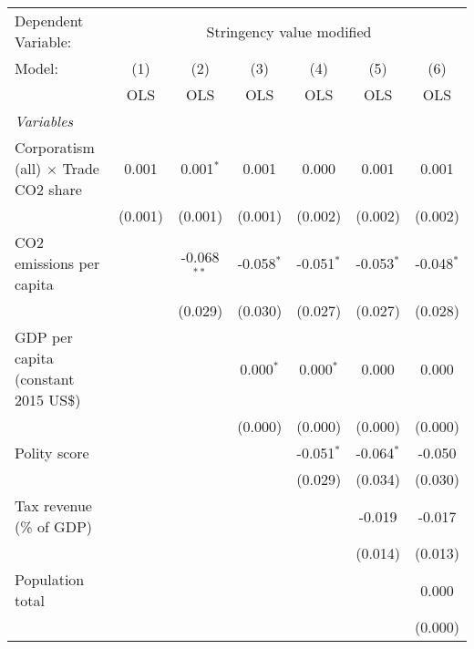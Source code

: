 
\begingroup
\centering
\begin{tabular}{lcccccc}
   \toprule
   Dependent Variable: & \multicolumn{6}{c}{Stringency value modified}\\
   Model:                                      & (1)     & (2)           & (3)          & (4)          & (5)          & (6)\\  
                                               &  OLS    & OLS           & OLS          & OLS          & OLS          & OLS\\  
   \midrule
   \emph{Variables}\\
   Corporatism (all) $\times$ Trade CO2 share  & 0.001   & 0.001$^{*}$   & 0.001        & 0.000        & 0.001        & 0.001\\   
                                               & (0.001) & (0.001)       & (0.001)      & (0.002)      & (0.002)      & (0.002)\\   
   CO2 emissions per capita                    &         & -0.068$^{**}$ & -0.058$^{*}$ & -0.051$^{*}$ & -0.053$^{*}$ & -0.048$^{*}$\\   
                                               &         & (0.029)       & (0.030)      & (0.027)      & (0.027)      & (0.028)\\   
   GDP per capita (constant 2015 US\$)         &         &               & 0.000$^{*}$  & 0.000$^{*}$  & 0.000        & 0.000\\   
                                               &         &               & (0.000)      & (0.000)      & (0.000)      & (0.000)\\   
   Polity score                                &         &               &              & -0.051$^{*}$ & -0.064$^{*}$ & -0.050\\   
                                               &         &               &              & (0.029)      & (0.034)      & (0.030)\\   
   Tax revenue (\% of GDP)                     &         &               &              &              & -0.019       & -0.017\\   
                                               &         &               &              &              & (0.014)      & (0.013)\\   
   Population total                            &         &               &              &              &              & 0.000\\   
                                               &         &               &              &              &              & (0.000)\\   

\end{tabular}

